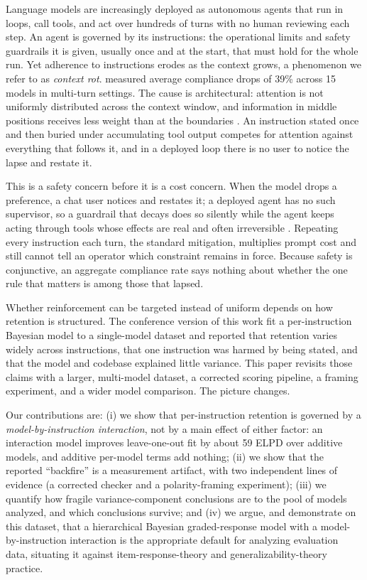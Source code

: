 \documentclass{llncs}
\begin{document}
Language models are increasingly deployed as autonomous agents that run in
loops, call tools, and act over hundreds of turns with no human reviewing
each step. An agent is governed by its instructions: the operational limits
and safety guardrails it is given, usually once and at the start, that must
hold for the whole run. Yet adherence to instructions erodes as the context
grows, a phenomenon we refer to as \emph{context rot}. \textcite{laban2025}
measured average compliance drops of 39\% across 15 models in multi-turn
settings. The cause is architectural: attention is not uniformly
distributed across the context window, and information in middle positions
receives less weight than at the boundaries \parencite{liu2024,
chowdhury2026}. An instruction stated once and then buried under
accumulating tool output competes for attention against everything that
follows it, and in a deployed loop there is no user to notice the lapse and
restate it.

This is a safety concern before it is a cost concern. When the model drops a
preference, a chat user notices and restates it; a deployed agent has no
such supervisor, so a guardrail that decays does so silently while the agent
keeps acting through tools whose effects are real and often irreversible
\parencite{mu2025}. Repeating every instruction each turn, the standard
mitigation, multiplies prompt cost and still cannot tell an operator which
constraint remains in force. Because safety is conjunctive, an aggregate
compliance rate says nothing about whether the one rule that matters is
among those that lapsed.

Whether reinforcement can be targeted instead of uniform depends on how
retention is structured. The conference version of this work
\parencite{korenblit2026} fit a per-instruction Bayesian model to a
single-model dataset and reported that retention varies widely across
instructions, that one instruction was harmed by being stated, and that the
model and codebase explained little variance. This paper revisits those
claims with a larger, multi-model dataset, a corrected scoring pipeline, a
framing experiment, and a wider model comparison. The picture changes.

Our contributions are: (i) we show that per-instruction retention is
governed by a \emph{model-by-instruction interaction}, not by a main effect
of either factor: an interaction model improves leave-one-out fit by about
59 ELPD over additive models, and additive per-model terms add nothing;
(ii) we show that the reported ``backfire'' is a measurement artifact, with
two independent lines of evidence (a corrected checker and a
polarity-framing experiment); (iii) we quantify how fragile
variance-component conclusions are to the pool of models analyzed, and which
conclusions survive; and (iv) we argue, and demonstrate on this dataset,
that a hierarchical Bayesian graded-response model with a
model-by-instruction interaction is the appropriate default for analyzing
evaluation data, situating it against item-response-theory and
generalizability-theory practice.
\end{document}
